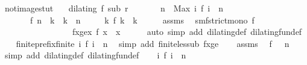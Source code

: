 \begin{isabellebody}
\isamarkupfalse%
%
\endisatagproof
{\isafoldproof}%
%
\isadelimproof
\isanewline
%
\endisadelimproof
\isanewline
{}\isamarkupfalse%
\ not{\isacharunderscore}image{\isacharunderscore}stut{\isacharcolon}\isanewline
\ \ \ {\isacartoucheopen}dilating\ f\ sub\ r{\isacartoucheclose}\isanewline
\ \ \ \ \ \ \ {\isacartoucheopen}n\ {\isacharequal}\ Max\ {\isacharbraceleft}i{\isachardot}\ f\ i\ {\isasymle}\ n{\isacharbraceright}{\isacartoucheclose}\isanewline
\ \ \ \ \ \ \ {\isacartoucheopen}f\ n\ {\isacharless}\ k\ {\isasymand}\ k\ {\isasymle}\ n{\isacartoucheclose}\isanewline
\ \ \ \ \ {\isacartoucheopen}{\isasymnexists}k\ f\ k\ {\isacharequal}\ k{\isacartoucheclose}\isanewline
%
\isadelimproof
%
\endisadelimproof
%
\isatagproof
{}\isamarkupfalse%
\ {\isacharminus}\isanewline
\ \ \isamarkupfalse%
\ assms{\isacharparenleft}{}{\isacharparenright}\ \isamarkupfalse%
\ smf{\isacharcolon}{\isacartoucheopen}strict{\isacharunderscore}mono\ f{\isacartoucheclose}\isanewline
\ \ \ \ \ \ \ \ \ \ \ \ \ \ \ \ \ fxge{\isacharcolon}{\isacartoucheopen}{\isasymforall}x{\isachardot}\ f\ x\ {\isasymge}\ x{\isacartoucheclose}\isanewline
\ \ \ \ \isamarkupfalse%
\ {\isacharparenleft}auto\ simp\ add{\isacharcolon}\ dilating{\isacharunderscore}def\ dilating{\isacharunderscore}fun{\isacharunderscore}def{\isacharparenright}\isanewline
\ \ \isamarkupfalse%
\ finite{\isacharunderscore}prefix{\isacharcolon}{\isacartoucheopen}finite\ {\isacharbraceleft}i{\isachardot}\ f\ i\ {\isasymle}\ n{\isacharbraceright}{\isacartoucheclose}\ \isamarkupfalse%
\ {\isacharparenleft}simp\ add{\isacharcolon}\ finite{\isacharunderscore}less{\isacharunderscore}ub\ fxge{\isacharparenright}\isanewline
\ \ \isamarkupfalse%
\ assms{\isacharparenleft}{}{\isacharparenright}\ \isamarkupfalse%
\ {\isacartoucheopen}f\ {}\ {\isasymle}\ n{\isacartoucheclose}\ \isamarkupfalse%
\ {\isacharparenleft}simp\ add{\isacharcolon}\ dilating{\isacharunderscore}def\ dilating{\isacharunderscore}fun{\isacharunderscore}def{\isacharparenright}\isanewline
\ \ \isamarkupfalse%
\ {\isacartoucheopen}{\isacharbraceleft}i{\isachardot}\ f\ i\ {\isasymle}\ n{\isacharbraceright}\ {\isasymnoteq}\ {\isacharbraceleft}{\isacharbraceright}{\isacartoucheclose}\ \isamarkupfalse%

\end{isabellebody}
